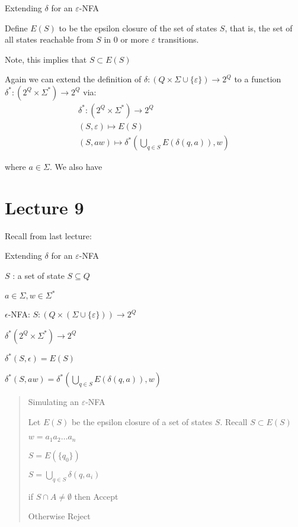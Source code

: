 \documentclass{article}
\begin{document}
Extending \(\delta\) for an \(\varepsilon\)-NFA

Define \(E(S)\) to be the epsilon closure of the set of states \(S\),
that is, the set of all states reachable from \(S\) in 0 or more
\(\varepsilon\) transitions.

Note, this implies that \(S \subset E(S)\)

Again we can extend the definition of
\(\delta: (Q \times \Sigma \cup \{\varepsilon\}) \to 2^Q\) to a function
\(\delta^* : (2^Q \times \Sigma^*) \to 2^Q\) via:
\begin{align*}
\delta^*: (2^Q \times \Sigma^*) \to 2^Q \\
(S, \varepsilon) \mapsto E(S) \\
(S, aw) \mapsto \delta^* \left ( \bigcup_{q \in S} E(\delta(q,a)),w \right )
\end{align*}

where \(a \in \Sigma\). We also have


\section{Lecture 9}\label{lecture-9}

Recall from last lecture:

Extending \(\delta\) for an \(\varepsilon\)-NFA

\(S\) : a set of state \(S \subseteq Q\)

\(a \in \Sigma, w \in \Sigma^*\)

\(\epsilon\)-NFA:
\(S: (Q \times (\Sigma \cup \{\varepsilon\})) \to 2^Q\)

\(\delta^*(2^Q \times \Sigma^*) \to 2^Q\)

\(\delta^*(S, \epsilon) = E(S)\)

\(\delta^*(S,aw) = \delta^*(\bigcup_{q \in S} E(\delta(q,a)),w)\)

\begin{quote}
Simulating an \(\varepsilon\)-NFA

Let \(E(S)\) be the epsilon closure of a set of states \(S\). Recall
\(S \subset E(S)\)

\(w = a_1 a_2 \ldots a_n\)

\(S = E(\{q_0\})\)

\(S = \bigcup_{q \in S} \delta(q, a_i)\)

if \(S \cap A \ne \emptyset\) then Accept

Otherwise Reject
\end{quote}
\end{document}
